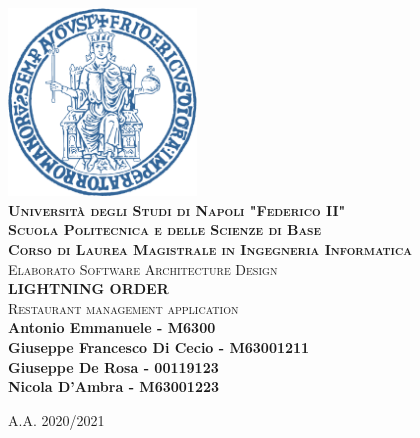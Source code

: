 \begin{titlepage}

\newcommand{\HRule}{\rule{\linewidth}{0.3mm}}
\center

\includegraphics[width=50mm]{logo_unina.png}\\
\vfill
\textsc{\LARGE \bfseries Università degli Studi di Napoli "Federico II"}\\[0.7cm] %
\textsc{\large \bfseries Scuola Politecnica e delle Scienze di Base}\\
\textsc{\large \bfseries Corso di Laurea Magistrale in Ingegneria Informatica}\\
\vfill
\textsc{\large Elaborato Software Architecture Design} \\[0.6cm]
\textbf{\Large LIGHTNING ORDER}\\[0.2cm]
\textsc{\large Restaurant management application}\\
\vfill
\bfseries{\large
Antonio Emmanuele - M6300\\
Giuseppe Francesco Di Cecio - M63001211\\
Giuseppe De Rosa - 00119123\\
Nicola D'Ambra - M63001223\\[0.5cm]
}

\vfill
{\text \large A.A. 2020/2021}
\end{titlepage}
